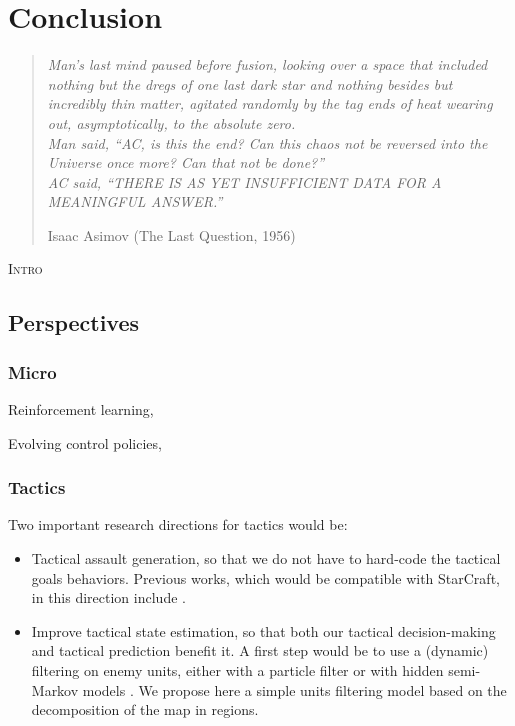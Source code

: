 \chapter{Conclusion}
\begin{quotation}\textit{
Man's last mind paused before fusion, looking over a space that included nothing but the dregs of one last dark star and nothing besides but incredibly thin matter, agitated randomly by the tag ends of heat wearing out, asymptotically, to the absolute zero.\\
Man said, ``AC, is this the end? Can this chaos not be reversed into the Universe once more? Can that not be done?''\\
AC said, ``THERE IS AS YET INSUFFICIENT DATA FOR A MEANINGFUL ANSWER.''
}
\begin{flushright}Isaac Asimov (The Last Question, 1956)\end{flushright}\end{quotation}

\lettrine{I}{ntro}

\section{Perspectives}
\label{chapter:perspectives}
\subsection{Micro}

Reinforcement learning, \citep{Marthi05concurrenthierarchical}


Evolving control policies, \citep{Miles2007}
\subsection{Tactics}

Two important research directions for tactics would be:
\begin{itemize}
    \item Tactical assault generation, so that we do not have to hard-code the tactical goals behaviors. Previous works, which would be compatible with StarCraft, in this direction include \citep{Chung05,PonsenMSA06,UCT,GellySchoenauer}.
    \item Improve tactical state estimation, so that both our tactical decision-making and tactical prediction benefit it. A first step would be to use a (dynamic) filtering on enemy units, either with a particle filter \citep{Thrun02d,weber2011aiide} or with hidden semi-Markov models \citep{Hladky_anevaluation}. We propose here a simple units filtering model based on the decomposition of the map in regions.
\end{itemize}

